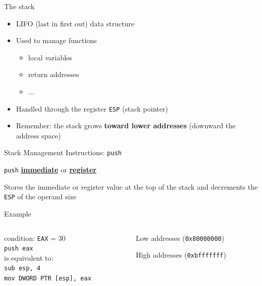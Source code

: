 \documentclass[]{beamer}
\begin{document}
\begin{frame}{The stack}
\begin{itemize}
	\item LIFO (last in first out) data structure
	\item Used to manage functions
		\begin{itemize}
		\item local variables
		\item return addresses
		\item ...
		\end{itemize}
	\item Handled through the register {\tt ESP} (stack pointer)
	\item Remember: the stack grows \textbf{toward lower addresses} (downward the address space)
\end{itemize}
\end{frame}

\begin{frame}[fragile]{Stack Management Instructions: {\tt push}}
	\par\noindent{}
	\centerline{{\tt push} \underline{{\bf immediate}} or \underline{\bf register}}
	\par\noindent Stores the immediate or register value at the top of the stack and decrements the {\tt ESP} of the operand size
	
	\begin{block}{Example}
	\begin{columns}
	\begin{column}{0.45\textwidth}
	 condition: {\tt EAX} = $30$ \\[.5em]
	{\tt push eax} \\[1em]
	is equivalent to: \\[1em]
	\alert<2>{{\small\tt sub esp, 4} \\}
	\alert<3>{{\small\tt mov DWORD PTR [esp], eax}}
	\end{column}
	
	\begin{column}{0.4\textwidth}
		\centering\par
		{\scriptsize Low addresses ({\tt 0x80000000})}\\[.5em]
		\begin{drawstack}[scale=0.7]
		\cell{}
		\cell{}
		 \only<1>{\cellptr{{\tt ESP}}}
		\end{drawstack}
		{\scriptsize High addresses ({\tt 0xbfffffff})}
	\end{column}	
	\end{columns}
	\end{block}
\end{frame}
\end{document}
